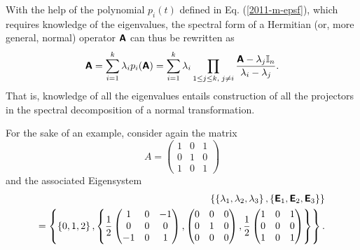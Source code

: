 With the help of the polynomial $p_i(t)$ defined in Eq. (\ref{2011-m-epsf}),
which requires knowledge of the eigenvalues,
the spectral form of a Hermitian (or, more general, normal) operator  $\textsf{\textbf{A}}$ can thus be rewritten as
\begin{equation}
\textsf{\textbf{A}}=\sum_{i=1}^k \lambda_i p_i(\textsf{\textbf{A}})=  \sum_{i=1}^k \lambda_i \prod_{
1\le j\le k,\;
j\neq i
}\frac{\textsf{\textbf{A}} - \lambda_j{\Bbb I}_n}{\lambda_i -\lambda_j}.
\end{equation}
That is, knowledge of all the eigenvalues entails construction
of all the projectors in the spectral decomposition
of a normal transformation.


{\color{blue}
\bexample
For the sake of an example, consider again the
{matrix}
\begin{equation}
A=
\begin{pmatrix}
1&0&1\\
0&1&0\\
1&0&1
\end{pmatrix}
\end{equation}
and the associated Eigensystem
\begin{equation}
\begin{split}
\left\{
\left\{  \lambda_1,\lambda_2,\lambda_3 \right\},\left\{ \textsf{\textbf{E}}_1,\textsf{\textbf{E}}_2,\textsf{\textbf{E}}_3\right\} \right\}\\
=
\left\{
\left\{  0,1,2 \right\},
\left\{
\frac{1}{2}
\begin{pmatrix}
1&0&-1\\
0&0&0\\
-1&0&1
\end{pmatrix}
,
\begin{pmatrix}
0&0&0\\
0&1&0\\
0&0&0
\end{pmatrix}
,
\frac{1}{2}
\begin{pmatrix}
1&0&1\\
0&0&0\\
1&0&1
\end{pmatrix}
\right\}
\right\} .
\end{split}
\end{equation}

}
